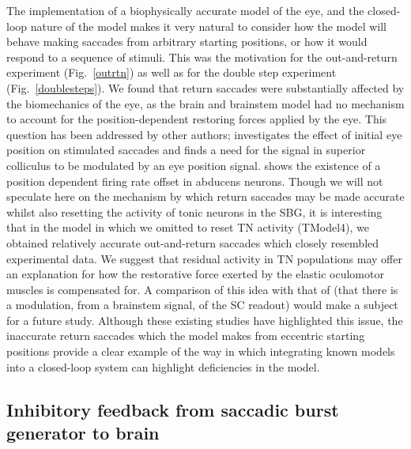\documentclass{frontiersSCNS}
\begin{document}
The implementation of a biophysically accurate model of the eye, and
the closed-loop nature of the model makes it very natural to consider
how the model will behave making saccades from arbitrary starting
positions, or how it would respond to a sequence of stimuli. This was
the motivation for the out-and-return experiment (Fig.~\ref{outrtn})
as well as for the double step experiment (Fig.~\ref{doublesteps}).
We found that return saccades were substantially affected by the
biomechanics of the eye, as the brain and brainstem model had no
mechanism to account for the position-dependent restoring forces
applied by the eye. This question has been addressed by other authors;
\cite{groh_effects_2011} investigates the effect of
initial eye position on stimulated saccades and finds a need for the
signal in superior colliculus to be modulated by an eye position
signal. \cite{ling_effects_2007} shows the existence of a position
dependent firing rate offset in abducens neurons. Though we will not
speculate here on the mechanism by which return saccades may be made
accurate whilst also resetting the activity of tonic neurons in the
SBG, it is interesting that in the model in which we omitted to reset
TN activity (TModel4), we obtained relatively accurate out-and-return
saccades which closely resembled experimental data.  We suggest that
residual activity in TN populations may offer an explanation for how
the restorative force exerted by the elastic oculomotor muscles is
compensated for. A comparison of this idea with that
of \cite{groh_effects_2011} (that there is a modulation, from a
brainstem signal, of the SC readout) would make a subject for a future
study. Although these existing studies have highlighted this issue,
the inaccurate return saccades which the model makes from eccentric
starting positions provide a clear example of the way in which
integrating known models into a closed-loop system can highlight
deficiencies in the model.

\subsection{Inhibitory feedback from saccadic burst generator to brain}
\end{document}
